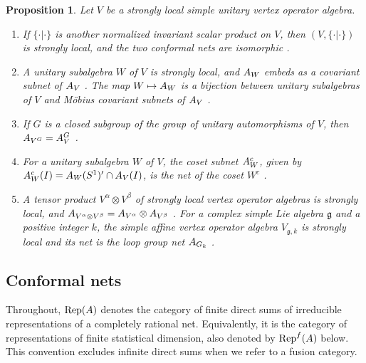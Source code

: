 \documentclass[leqno]{article}
\let\cal\relax
\newcommand{\cal}{\mathcal}
\newcommand{\ot}{\otimes}
\DeclareMathOperator{\Rep}{Rep} %
\newtheorem{prop}[thm]{Proposition}
\numberwithin{equation}{section}
\begin{document}
\begin{prop}
\label{prop:CKLW}
Let $V$ be a strongly local simple unitary vertex operator algebra.
\begin{enumerate}
\item If $\{\cdot|\cdot\}$ is another normalized invariant scalar product on $V$, then $(V,\{\cdot|\cdot\})$ is strongly local, and the two conformal nets are isomorphic \cite[Theorem 6.8 p.~53]{CKLW18}.
\item A unitary subalgebra $W$ of $V$ is strongly local, and $\cal A_W$ embeds as a covariant subnet of $\cal A_V$ \cite[Theorem 7.1 p.~55]{CKLW18}. The map $W \mapsto \cal A_W$ is a bijection between unitary subalgebras of $V$ and Möbius covariant subnets of $\cal A_V$ \cite[Theorem 7.5 p.~58]{CKLW18}.
\item If $G$ is a closed subgroup of the group of unitary automorphisms of $V$, then $\cal A_{V^G} = \cal A_V^G$ \cite[Proposition 7.6 p.~58]{CKLW18}.
\item For a unitary subalgebra $W$ of $V$, the coset subnet $\cal A_W^c$, given by $\cal A_W^c(I) = \cal A_W(S^1)' \cap \cal A_V(I)$, is the net of the coset $W^c$ \cite[Proposition 7.8 p.~58]{CKLW18}.
\item A tensor product $V^\alpha \ot V^\beta$ of strongly local vertex operator algebras is strongly local, and $\cal A_{V^\alpha \ot V^\beta} = \cal A_{V^\alpha} \ot \cal A_{V^\beta}$ \cite[Corollary 8.2 p.~62]{CKLW18}. For a complex simple Lie algebra $\mathfrak g$ and a positive integer $k$, the simple affine vertex operator algebra $V_{\mathfrak g,k}$ is strongly local and its net is the loop group net $\cal A_{G_k}$ \cite[Example 8.7 p.~63]{CKLW18}.
\end{enumerate}
\end{prop}

\subsection{Conformal nets}
\label{subsec:nets}

Throughout, $\Rep(\cal A)$ denotes the category of finite direct sums of irreducible representations of a completely rational net. Equivalently, it is the category of representations of finite statistical dimension, also denoted by $\Rep^f(\cal A)$ below. This convention excludes infinite direct sums when we refer to a fusion category.
\end{document}
